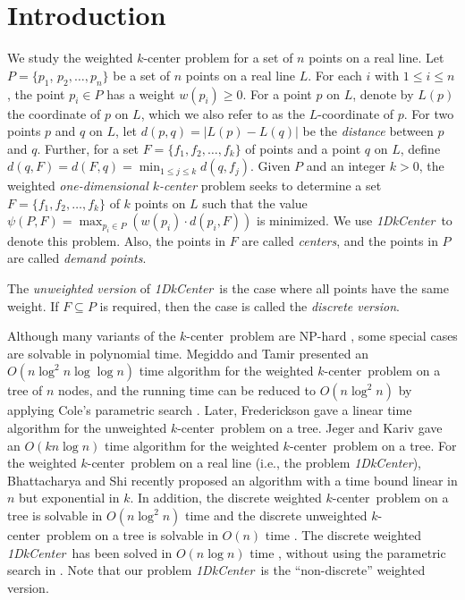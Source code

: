 \documentclass{llncs}
\def\cen{$k$-center}
\def\problem{{\it 1DkCenter}}
\begin{document}
\section{Introduction}
\label{sec:intro}

We study the weighted $k$-center problem for a set
of $n$ points on a real line. Let $P=\{p_1$, $p_2,\ldots,p_n\}$ be a set
of $n$ points on a real line $L$. For each $i$ with $1\leq i\leq n$,
the point $p_i\in P$ has a weight $w(p_i)\geq 0$. For a point $p$ on
$L$, denote by $L(p)$ the coordinate of $p$ on $L$, which we also
refer to as the $L$-coordinate of $p$. For two points $p$ and $q$ on
$L$, let $d(p,q)=|L(p)-L(q)|$ be the {\em distance} between $p$ and
$q$. Further, for a set $F=\{f_1,f_2,\ldots,f_k\}$ of
points and a point $q$ on $L$, define $d(q,F)=d(F,q)=\min_{1\leq
j\leq k}d(q,f_j)$. Given $P$ and an integer $k>0$, the weighted
{\em one-dimensional $k$-center} problem seeks to determine a set
$F=\{f_1,f_2,\ldots,f_k\}$ of $k$ points on $L$ such that the value
$\psi(P,F)=\max_{p_i\in P}(w(p_i)\cdot d(p_i,F))$ is minimized. We
use \problem\ to denote this problem. Also, the points in $F$ are
called {\em centers}, and the points in $P$ are called
{\em demand points}.


The {\em unweighted version} of \problem\ is the case where all
points have the same weight. If $F\subseteq P$ is required, then the
case is called the {\em discrete version}.




Although many variants of the \cen\ problem are NP-hard
\cite{ref:Ben-MosheAn06,ref:ChandrasekaranPo82,ref:FredericksonFi83,ref:KarivAn79,ref:MegiddoNe83}, some special cases are
solvable in polynomial time. Megiddo and Tamir
\cite{ref:MegiddoNe83} presented an $O(n\log^2 n\log\log n)$ time
algorithm for the weighted \cen\ problem on a tree of $n$ nodes, and
the running time can be reduced to $O(n\log^2 n)$ by applying Cole's
parametric search \cite{ref:ColeSl87}. Later, Frederickson
\cite{ref:FredericksonPa91} gave a linear time algorithm for the
unweighted \cen\ problem on a tree. Jeger and Kariv
\cite{ref:JegerAl85} gave an $O(kn\log n)$ time algorithm for the
weighted \cen\ problem on a tree. For the weighted \cen\ problem on
a real line (i.e., the problem \problem), Bhattacharya and Shi
\cite{ref:BhattacharyaOp07} recently proposed an algorithm with a
time bound linear in $n$ but exponential in $k$.
In addition, the discrete weighted \cen\ problem on a tree is solvable in
$O(n\log^2 n)$ time \cite{ref:MegiddoAn81} and the discrete
unweighted \cen\ problem on a tree is solvable in $O(n)$ time
\cite{ref:FredericksonPa91}.
The discrete weighted \problem\ has been solved in
$O(n\log n)$ time \cite{ref:MegiddoAn81}, without using the parametric search in \cite{ref:ColeSl87}.
Note that our problem \problem\ is the
``non-discrete'' weighted version.
\end{document}

